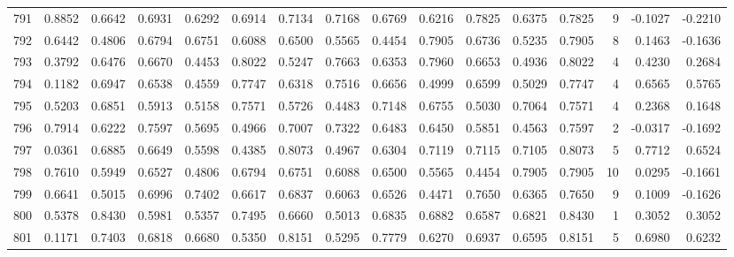 \begin{tabular}{lrrrrrrrrrrrrrrr}
791 &      0.8852 &  0.6642 &  0.6931 &  0.6292 &  0.6914 &  0.7134 &  0.7168 &  0.6769 &  0.6216 &  0.7825 &   0.6375 &     0.7825 &      9 &                   -0.1027 &                    -0.2210 \\
792 &      0.6442 &  0.4806 &  0.6794 &  0.6751 &  0.6088 &  0.6500 &  0.5565 &  0.4454 &  0.7905 &  0.6736 &   0.5235 &     0.7905 &      8 &                    0.1463 &                    -0.1636 \\
793 &      0.3792 &  0.6476 &  0.6670 &  0.4453 &  0.8022 &  0.5247 &  0.7663 &  0.6353 &  0.7960 &  0.6653 &   0.4936 &     0.8022 &      4 &                    0.4230 &                     0.2684 \\
794 &      0.1182 &  0.6947 &  0.6538 &  0.4559 &  0.7747 &  0.6318 &  0.7516 &  0.6656 &  0.4999 &  0.6599 &   0.5029 &     0.7747 &      4 &                    0.6565 &                     0.5765 \\
795 &      0.5203 &  0.6851 &  0.5913 &  0.5158 &  0.7571 &  0.5726 &  0.4483 &  0.7148 &  0.6755 &  0.5030 &   0.7064 &     0.7571 &      4 &                    0.2368 &                     0.1648 \\
796 &      0.7914 &  0.6222 &  0.7597 &  0.5695 &  0.4966 &  0.7007 &  0.7322 &  0.6483 &  0.6450 &  0.5851 &   0.4563 &     0.7597 &      2 &                   -0.0317 &                    -0.1692 \\
797 &      0.0361 &  0.6885 &  0.6649 &  0.5598 &  0.4385 &  0.8073 &  0.4967 &  0.6304 &  0.7119 &  0.7115 &   0.7105 &     0.8073 &      5 &                    0.7712 &                     0.6524 \\
798 &      0.7610 &  0.5949 &  0.6527 &  0.4806 &  0.6794 &  0.6751 &  0.6088 &  0.6500 &  0.5565 &  0.4454 &   0.7905 &     0.7905 &     10 &                    0.0295 &                    -0.1661 \\
799 &      0.6641 &  0.5015 &  0.6996 &  0.7402 &  0.6617 &  0.6837 &  0.6063 &  0.6526 &  0.4471 &  0.7650 &   0.6365 &     0.7650 &      9 &                    0.1009 &                    -0.1626 \\
800 &      0.5378 &  0.8430 &  0.5981 &  0.5357 &  0.7495 &  0.6660 &  0.5013 &  0.6835 &  0.6882 &  0.6587 &   0.6821 &     0.8430 &      1 &                    0.3052 &                     0.3052 \\
801 &      0.1171 &  0.7403 &  0.6818 &  0.6680 &  0.5350 &  0.8151 &  0.5295 &  0.7779 &  0.6270 &  0.6937 &   0.6595 &     0.8151 &      5 &                    0.6980 &                     0.6232 \\

\end{tabular}
